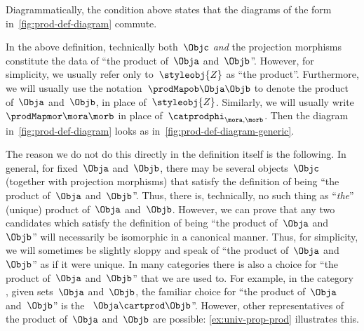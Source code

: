 \begin{marginfigure}
    \centering
    \caption{}
    \label{fig:prod-def-diagram}
\end{marginfigure}

\begin{remark}
    \label{re:prod-comm-diag}
    Diagrammatically, the condition above states that the diagrams of the form in~\cref{fig:prod-def-diagram} commute.
\end{remark}

\begin{marginfigure}
    \centering
    \caption{}
    \label{fig:prod-def-diagram-generic}
\end{marginfigure}

\begin{remark}
    \label{prod unique up to iso}
    In the above definition, technically both~$\Objc$ \emph{and} the projection morphisms constitute the data of ``the product of~$\Obja$ and~$\Objb$''.
    However, for simplicity, we usually refer only to~$\styleobj{Z}$ as ``the product''.
    Furthermore, we will usually use the notation~$\prodMapob\Obja\Objb$ to denote the product of~$\Obja$ and~$\Objb$, in place of~$\styleobj{Z}$.
    Similarly, we will usually write~$\prodMapmor\mora\morb$ in place of~$\catprodphi_{\mora, \morb}$.
    Then the diagram in~\cref{fig:prod-def-diagram} looks as in~\cref{fig:prod-def-diagram-generic}.

    The reason we do not do this directly in the definition itself is the following.
    In general, for fixed~$\Obja$ and~$\Objb$, there may be several objects~$\Objc$ (together with projection morphisms) that satisfy the definition of being ``the product of~$\Obja$ and~$\Objb$''.
    Thus, there is, technically, no such thing as ``\emph{the}'' (unique) product of~$\Obja$ and~$\Objb$.
    However, we can prove that any two candidates which satisfy the definition of being ``the product of~$\Obja$ and~$\Objb$'' will necessarily be isomorphic in a canonical manner.
    Thus, for simplicity, we will sometimes be slightly sloppy and speak of ``the product of~$\Obja$ and~$\Objb$'' as if it were unique.
    In many categories there is also a choice for ``the product of~$\Obja$ and~$\Objb$'' that we are used to.
    For example, in the category \Set, given sets~$\Obja$ and~$\Objb$, the familiar choice for ``the product of~$\Obja$ and~$\Objb$'' is the ~$\Obja \cartprod \Objb$''.
    However, other representatives of the product of~$\Obja$ and~$\Objb$ are possible: \cref{ex:univ-prop-prod} illustrates this.
\end{remark}

